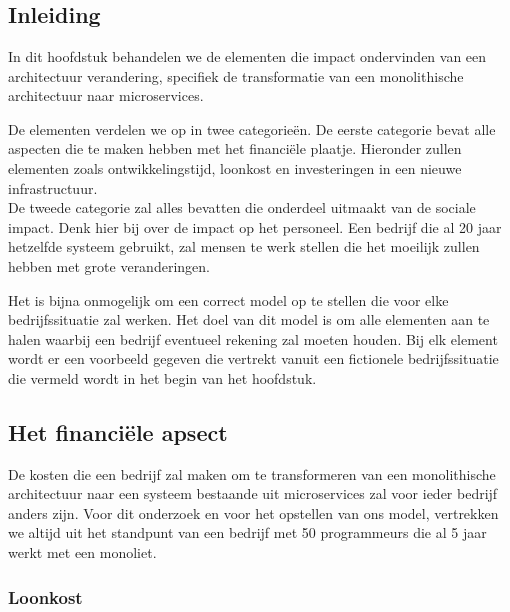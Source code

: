 
\chapter{}
\label{ch:model}



\section{Inleiding}

In dit hoofdstuk behandelen we de elementen die impact ondervinden van een architectuur verandering, specifiek de transformatie van een monolithische architectuur naar microservices.

De elementen verdelen we op in twee categorieën. De eerste categorie bevat alle aspecten die te maken hebben met het financiële plaatje. Hieronder zullen elementen zoals ontwikkelingstijd, loonkost en investeringen in een nieuwe infrastructuur. \\
De tweede categorie zal alles bevatten die onderdeel uitmaakt van de sociale impact. Denk hier bij over de impact op het personeel. Een bedrijf die al 20 jaar hetzelfde systeem gebruikt, zal mensen te werk stellen die het moeilijk zullen hebben met grote veranderingen.

Het is bijna onmogelijk om een correct model op te stellen die voor elke bedrijfssituatie zal werken. Het doel van dit model is om alle elementen aan te halen waarbij een bedrijf eventueel rekening zal moeten houden. Bij elk element wordt er een voorbeeld gegeven die vertrekt vanuit een fictionele bedrijfssituatie die vermeld wordt in het begin van het hoofdstuk.

\section{Het financiële apsect}

De kosten die een bedrijf zal maken om te transformeren van een monolithische architectuur naar een systeem bestaande uit microservices zal voor ieder bedrijf anders zijn. Voor dit onderzoek en voor het opstellen van ons model, vertrekken we altijd uit het standpunt van een bedrijf met 50 programmeurs die al 5 jaar werkt met een monoliet. 

\subsection{Loonkost}

